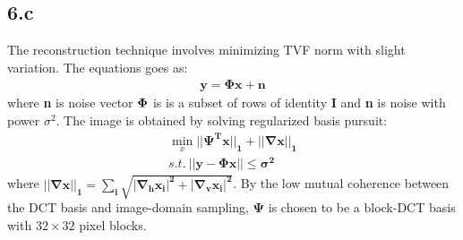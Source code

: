 \documentclass[12pt]{article}
\begin{document}
\subsection*{6.c}
The reconstruction technique involves minimizing TVF norm with slight variation. The equations goes as:
\begin{align*}
    \boldsymbol{\textbf{y} = \Phi\textbf{x}+\textbf{n}}
\end{align*}
where \textbf{n} is noise vector $\bold\Phi$ is is a subset of rows of identity \textbf{I} and \textbf{n} is noise with power $\sigma^2$.
The image is obtained by solving regularized basis pursuit:
\begin{align*}
    \min_{x} \boldsymbol{||\Psi^Tx||_1 + ||\nabla x||_1}\\
    s.t. \ \boldsymbol{||y - \Phi x|| \leq  \sigma^2}
\end{align*}
 where  $\boldsymbol{||\nabla x||_1 = \sum_i\sqrt{|\nabla_hx_i|^2+|\nabla_vx_i|^2}}$. By the low mutual coherence
between the DCT basis and image-domain sampling, $\boldsymbol{\Psi}$ is chosen to be a block-DCT basis  with $32 \times 32$ pixel blocks. 
\end{document}

